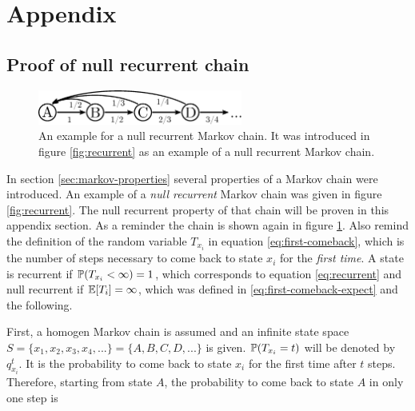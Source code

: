 \section*{Appendix}
\renewcommand{\thesubsection}{\Alph{subsection}}
\setcounter{subsection}{0}


\subsection{Proof of null recurrent chain}
\label{sec:proof-null-recurrent}

\begin{figure}[!b]
	\centering
	\includegraphics[width=0.6\textwidth]{appendix/mcmc-null-recurrent}
	\caption[Null recurrent Markov chain]{An example for a null recurrent Markov chain. It was introduced in figure \ref{fig:recurrent} as an example of a null recurrent Markov chain.}
	\label{fig:null-recurrent}
\end{figure}

In section \ref{sec:markov-properties} several properties of a Markov chain were introduced. An example of a \emph{null recurrent} Markov chain was given in figure \ref{fig:recurrent}. The null recurrent property of that chain will be proven in this appendix section. As a reminder the chain is shown again in figure \ref{fig:null-recurrent}. Also remind the definition of the random variable $T_{x_i}$ in equation \eqref{eq:first-comeback}, which is the number of steps necessary to come back to state $x_i$ for the \emph{first time}. A state is recurrent if $\mathbb{P}(T_{x_i} < \infty) = 1$, which corresponds to equation \eqref{eq:recurrent} and null recurrent if $\mathbb{E}[T_i] = \infty$, which was defined in \eqref{eq:first-comeback-expect} and the following.

First, a homogen Markov chain is assumed and an infinite state space $S = \{x_1, x_2, x_3, x_4, ...\} = \{A, B, C, D, ...\}$ is given. $\mathbb{P}(T_{x_i} = t)$ will be denoted by $q_{x_i}^t$. It is the probability to come back to state $x_i$ for the first time after $t$ steps. Therefore, starting from state $A$, the probability to come back to state $A$ in only one step is

